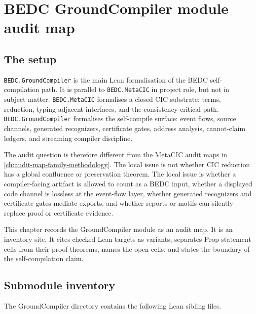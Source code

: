 \chapter{BEDC GroundCompiler module audit map}
\label{ch:bedc-groundcompiler-audit-map}

\section{The setup}
\label{sec:bedc-groundcompiler-audit-map-setup}

\texttt{BEDC.GroundCompiler} is the main Lean formalisation of the BEDC
self-compilation path. It is parallel to \texttt{BEDC.MetaCIC} in project
role, but not in subject matter. \texttt{BEDC.MetaCIC} formalises a closed CIC
substrate: terms, reduction, typing-adjacent interfaces, and the consistency
critical path. \texttt{BEDC.GroundCompiler} formalises the self-compile
surface: event flows, source channels, generated recognizers, certificate
gates, address analysis, cannot-claim ledgers, and streaming compiler
discipline.

The audit question is therefore different from the MetaCIC audit maps in
\autoref{ch:audit-map-family-methodology}. The local issue is not whether CIC
reduction has a global confluence or preservation theorem. The local issue is
whether a compiler-facing artifact is allowed to count as a BEDC input,
whether a displayed code channel is lossless at the event-flow layer, whether
generated recognizers and certificate gates mediate exports, and whether
reports or motifs can silently replace proof or certificate evidence.

This chapter records the GroundCompiler module as an audit map. It is an
inventory site. It cites checked Lean targets as variants, separates Prop
statement cells from their proof theorems, names the open cells, and states
the boundary of the self-compilation claim.

\section{Submodule inventory}
\label{sec:bedc-groundcompiler-audit-map-submodule-inventory}

The GroundCompiler directory contains the following Lean sibling files.

